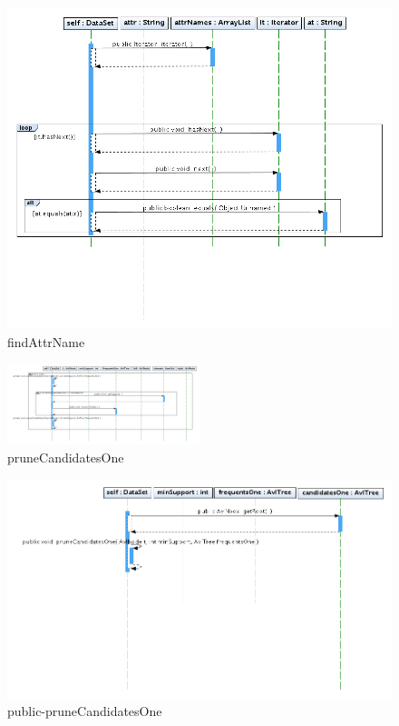 \begin{figure}
\centering
\includegraphics[width=1\textwidth]{imgsSecuencia/DataSet/findAttrName.png}
\caption{findAttrName}
\end{figure}
\newpage
\begin{figure}
\centering
\includegraphics[angle=90, width=0.5\textwidth]{imgsSecuencia/DataSet/pruneCandidatesOne.png}
\caption{pruneCandidatesOne}
\end{figure}
\newpage
\begin{figure}
\centering
\includegraphics[width=1.2\textwidth]{imgsSecuencia/DataSet/pruneCandidatesOne_public.png}
\caption{public-pruneCandidatesOne}
\end{figure}
\newpage
